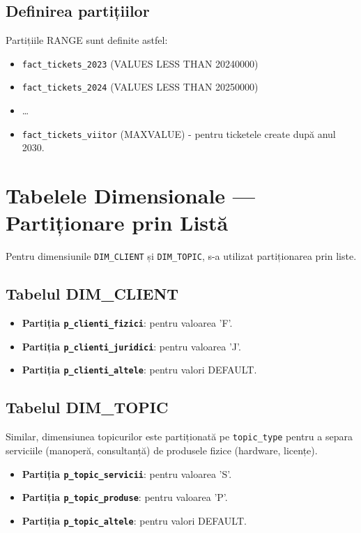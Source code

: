 \subsection{Definirea partițiilor}

Partițiile RANGE sunt definite astfel:
\begin{itemize}
    \item \texttt{fact\_tickets\_2023} (VALUES LESS THAN 20240000)
    \item \texttt{fact\_tickets\_2024} (VALUES LESS THAN 20250000)
    \item \dots
    \item \texttt{fact\_tickets\_viitor} (MAXVALUE) - pentru ticketele create după anul 2030.
\end{itemize}

\section{Tabelele Dimensionale — Partiționare prin Listă}

Pentru dimensiunile \texttt{DIM\_CLIENT} și \texttt{DIM\_TOPIC}, s-a utilizat partiționarea prin liste.

\subsection{Tabelul DIM\_CLIENT}

\begin{itemize}
    \item \textbf{Partiția \texttt{p\_clienti\_fizici}}: pentru valoarea 'F'.
    \item \textbf{Partiția \texttt{p\_clienti\_juridici}}: pentru valoarea 'J'.
    \item \textbf{Partiția \texttt{p\_clienti\_altele}}: pentru valori DEFAULT.
\end{itemize}

\subsection{Tabelul DIM\_TOPIC}

Similar, dimensiunea topicurilor este partiționată pe \texttt{topic\_type} pentru a separa serviciile (manoperă, consultanță) de produsele fizice (hardware, licențe).

\begin{itemize}
    \item \textbf{Partiția \texttt{p\_topic\_servicii}}: pentru valoarea 'S'.
    \item \textbf{Partiția \texttt{p\_topic\_produse}}: pentru valoarea 'P'.
    \item \textbf{Partiția \texttt{p\_topic\_altele}}: pentru valori DEFAULT.
\end{itemize}


